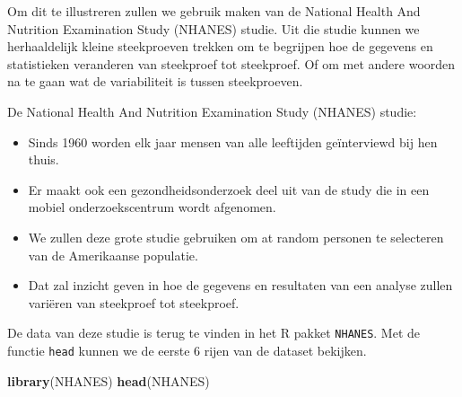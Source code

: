 \documentclass[
  12pt,dutch,coursenotes]{book}
\newenvironment{Shaded}{\begin{snugshade}}{\end{snugshade}}
\newcommand{\KeywordTok}[1]{\textcolor[rgb]{0.13,0.29,0.53}{\textbf{#1}}}
\newcommand{\NormalTok}[1]{#1}
\theoremstyle{definition}
\theoremstyle{definition}
\theoremstyle{definition}
\theoremstyle{remark}
\begin{document}
Om dit te illustreren zullen we gebruik maken van de National Health And Nutrition Examination Study (NHANES) studie. Uit die studie kunnen we herhaaldelijk kleine steekproeven trekken om te begrijpen hoe de gegevens en statistieken veranderen van steekproef tot steekproef. Of om met andere woorden na te gaan wat de variabiliteit is tussen steekproeven.

De National Health And Nutrition Examination Study (NHANES) studie:

\begin{itemize}
\item
  Sinds 1960 worden elk jaar mensen van alle leeftijden geïnterviewd bij hen thuis.
\item
  Er maakt ook een gezondheidsonderzoek deel uit van de study die in een mobiel onderzoekscentrum wordt afgenomen.
\item
  We zullen deze grote studie gebruiken om at random personen te selecteren van de Amerikaanse populatie.
\item
  Dat zal inzicht geven in hoe de gegevens en resultaten van een analyse zullen variëren van steekproef tot steekproef.
\end{itemize}

De data van deze studie is terug te vinden in het R pakket \texttt{NHANES}. Met de functie \texttt{head} kunnen we de eerste 6 rijen van de dataset bekijken.

\begin{Shaded}
\begin{Highlighting}[]
\KeywordTok{library}\NormalTok{(NHANES)}
\KeywordTok{head}\NormalTok{(NHANES)}
\end{Highlighting}
\end{Shaded}
\end{document}
